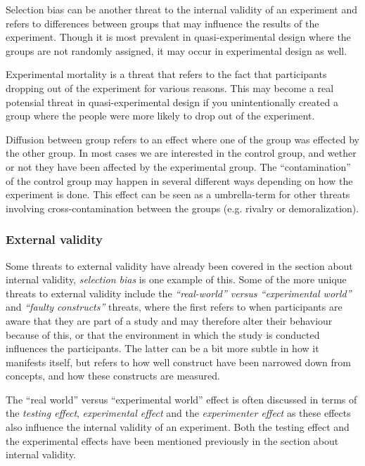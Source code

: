 	\bigskip\noindent
	Selection bias can be another threat to the internal validity of an experiment and refers to differences between groups that may influence the results of the experiment. Though it is most prevalent in quasi-experimental design where the groups are not randomly assigned, it may occur in experimental design as well. 
	
	\bigskip\noindent
	Experimental mortality is a threat that refers to the fact that participants dropping out of the experiment for various reasons. This may become a real potensial threat in quasi-experimental design if you unintentionally created a group where the people were more likely to drop out of the experiment.
	
	\bigskip\noindent
	Diffusion between group refers to an effect where one of the group was effected by the other group. In most cases we are interested in the control group, and wether or not they have been affected by the experimental group. The "`contamination"' of the control group may happen in several different ways depending on how the experiment is done. 
	This effect can be seen as a umbrella-term for other threats involving cross-contamination between the groups (e.g. rivalry or demoralization).
	
	\subsubsection{External validity}
	Some threats to external validity have already been covered in the section about internal validity, \textit{selection bias} is one example of this. 
	Some of the more unique threats to external validity include the \textit{"`real-world"' versus "`experimental world"'} and \textit{"`faulty constructs"'} threats, where the first refers to when participants are aware that they are part of a study and may therefore alter their behaviour because of this, or that the environment in which the study is conducted influences the participants. The latter can be a bit more subtle in how it manifests itself, but refers to how well construct have been narrowed down from concepts, and how these constructs are measured.
	
	\bigskip\noindent
	The "`real world"' versus "`experimental world"' effect is often discussed in terms of the \textit{testing effect}, \textit{experimental effect} and the \textit{experimenter effect} as these effects also influence the internal validity of an experiment. Both the testing effect and the experimental effects have been mentioned previously in the section about internal validity.
	
